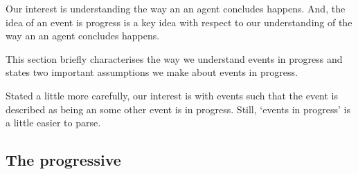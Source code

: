 \begin{note}
  Our interest is understanding the way an  an agent concludes happens.
  And, the idea of an event is progress is a key idea with respect to our understanding of the way an  an agent concludes happens.

  This section briefly characterises the way we understand events in progress and states two important assumptions we make about events in progress.

  Stated a little more carefully, our interest is with events such that the event is described as being an  some other event is in progress.
  Still, `events in progress' is a little easier to parse.
\end{note}



\subsection{The progressive}
\label{sec:progressive}


